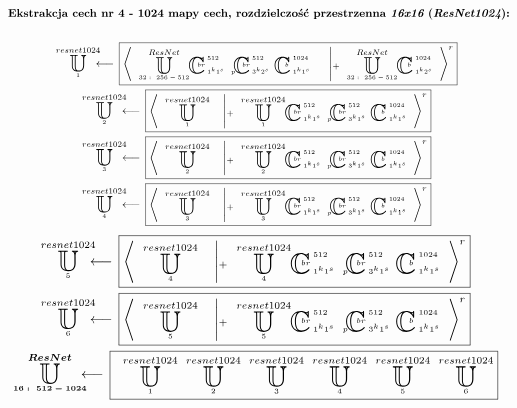 \begin{equation*}
\begin{gathered}
\textbf{Ekstrakcja cech nr 4 - 1024 mapy cech, rozdzielczość przestrzenna $\textit{16x16}$ ($\textit{ResNet1024}$):}
\\~\\
\xunitdef{resnet1024}{1}{
\xaggreg{\quad
\xunit{ResNet}{32:\ 256-512}{}
\xconv{\ 1^k1^s}{\ 512}{}{}{br}
\xconv{\ 3^k2^s}{\ 512}{p}{}{br}
\xconv{\ 1^k1^s}{\ 1024}{}{}{b}
\quad \left|_+ \quad
\xunit{ResNet}{32:\ 256-512}{}
\xconv{\ 1^k2^s}{\ 1024}{}{}{b}
\right.}^r}
\\
\xunitdef{resnet1024}{2}{
\xaggreg{\quad
\xunit{resnet1024}{1}{}
\quad \left|_+ \quad
\xunit{resnet1024}{1}{}
\xconv{\ 1^k1^s}{\ 512}{}{}{br}
\xconv{\ 3^k1^s}{\ 512}{p}{}{br}
\xconv{\ 1^k1^s}{\ 1024}{}{}{b}
\right.}^r}
\\
\xunitdef{resnet1024}{3}{
\xaggreg{\quad
\xunit{resnet1024}{2}{}
\quad \left|_+ \quad
\xunit{resnet1024}{2}{}
\xconv{\ 1^k1^s}{\ 512}{}{}{br}
\xconv{\ 3^k1^s}{\ 512}{p}{}{br}
\xconv{\ 1^k1^s}{\ 1024}{}{}{b}
\right.}^r}
\\
\xunitdef{resnet1024}{4}{
\xaggreg{\quad
\xunit{resnet1024}{3}{}
\quad \left|_+ \quad
\xunit{resnet1024}{3}{}
\xconv{\ 1^k1^s}{\ 512}{}{}{br}
\xconv{\ 3^k1^s}{\ 512}{p}{}{br}
\xconv{\ 1^k1^s}{\ 1024}{}{}{b}
\right.}^r}
\end{gathered}
\end{equation*}
\begin{equation*}
\begin{gathered}
\xunitdef{resnet1024}{5}{
\xaggreg{\quad
\xunit{resnet1024}{4}{}
\quad \left|_+ \quad
\xunit{resnet1024}{4}{}
\xconv{\ 1^k1^s}{\ 512}{}{}{br}
\xconv{\ 3^k1^s}{\ 512}{p}{}{br}
\xconv{\ 1^k1^s}{\ 1024}{}{}{b}
\right.}^r}
\\
\xunitdef{resnet1024}{6}{
\xaggreg{\quad
\xunit{resnet1024}{5}{}
\quad \left|_+ \quad
\xunit{resnet1024}{5}{}
\xconv{\ 1^k1^s}{\ 512}{}{}{br}
\xconv{\ 3^k1^s}{\ 512}{p}{}{br}
\xconv{\ 1^k1^s}{\ 1024}{}{}{b}
\right.}^r}
\\
\xunitdef{\boldsymbol{ResNet}}{\boldsymbol{16:\ 512-1024}}{ \quad
\xunit{resnet1024}{1}{} \quad
\xunit{resnet1024}{2}{} \quad
\xunit{resnet1024}{3}{} \quad
\xunit{resnet1024}{4}{} \quad
\xunit{resnet1024}{5}{}\quad
\xunit{resnet1024}{6}{}}
\end{gathered}
\end{equation*}
